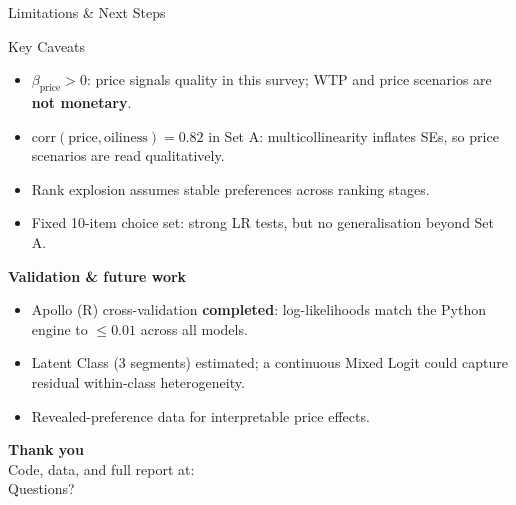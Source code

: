 \documentclass[10pt,aspectratio=169]{beamer}
\begin{document}
\begin{frame}{Limitations \& Next Steps}

  \begin{alertblock}{Key Caveats}
    \begin{itemize}
      \item $\beta_{\text{price}} > 0$: price signals quality in this survey;
            WTP and price scenarios are \textbf{not monetary}.
      \item $\text{corr}(\text{price}, \text{oiliness}) = 0.82$ in Set A:
            multicollinearity inflates SEs, so price scenarios are read qualitatively.
      \item Rank explosion assumes stable preferences across ranking stages.
      \item Fixed 10-item choice set: strong LR tests, but no generalisation
            beyond Set A.
    \end{itemize}
  \end{alertblock}

  \vspace{4pt}
  \textbf{Validation \& future work}
  \begin{itemize}
    \item Apollo (R) cross-validation \textbf{completed}: log-likelihoods match
          the Python engine to $\leq 0.01$ across all models.
    \item Latent Class (3 segments) estimated; a continuous Mixed Logit could
          capture residual within-class heterogeneity.
    \item Revealed-preference data for interpretable price effects.
  \end{itemize}

  \vspace{8pt}
  \begin{center}
    {\Large \textbf{Thank you}}\\[8pt]
    \footnotesize
    Code, data, and full report at:
    \\[4pt]
    Questions?
  \end{center}
\end{frame}
\end{document}
